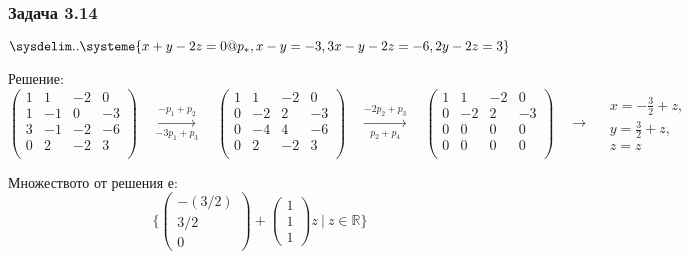 \documentclass{subfiles}
\begin{document}
\subsubsection{Задача 3.14}

\begin{equation*}
    \sysdelim..\systeme{
        x + y - 2z = 0@p_{*},
        x - y = -3,
        3x - y - 2z = -6,
        2y - 2z = 3
    }
\end{equation*}

\noindent Решение:
\begin{equation*}
    \left(
        \begin{array}{ ccc|c }
            1 & 1  & -2 &  0 \\
            1 & -1 &  0 & -3 \\
            3 & -1 & -2 & -6 \\
            0 & 2  & -2 &  3 \\
        \end{array}
    \right)
    \quad
    \overset{-p_{1}+p_{2}}{\underset{-3p_{1}+p_{3}}{\longrightarrow}}
    \quad
    \left(
    \begin{array}{ ccc|c }
        1 & 1  & -2 &  0 \\
        0 & -2 &  2 & -3 \\
        0 & -4 &  4 & -6 \\
        0 & 2  & -2 &  3 \\
    \end{array}
    \right)
    \quad
    \overset{-2p_{2}+p_{3}}{\underset{p_{2}+p_{4}}{\longrightarrow}}
    \quad
    \left(
    \begin{array}{ ccc|c }
        1 & 1  & -2 &  0 \\
        0 & -2 &  2 & -3 \\
        0 &  0 &  0 &  0 \\
        0 &  0 &  0 &  0 \\
    \end{array}
    \right)
    \quad
    \longrightarrow
    \quad
    \begin{array}{ c }
        x = -\frac{3}{2} + z,\\
        y = \frac{3}{2} + z, \\
        z = z
    \end{array}
\end{equation*}

\noindent Множеството от решения е:
\begin{equation*}
    \{
        \left(\begin{array}{ c } -(3/2) \\ 3/2 \\ 0 \end{array}\right) +
        \left(\begin{array}{ c } 1 \\ 1 \\ 1 \end{array}\right) z
        \ |\ z \in \mathbb{R}
    \}
\end{equation*}
\end{document}
